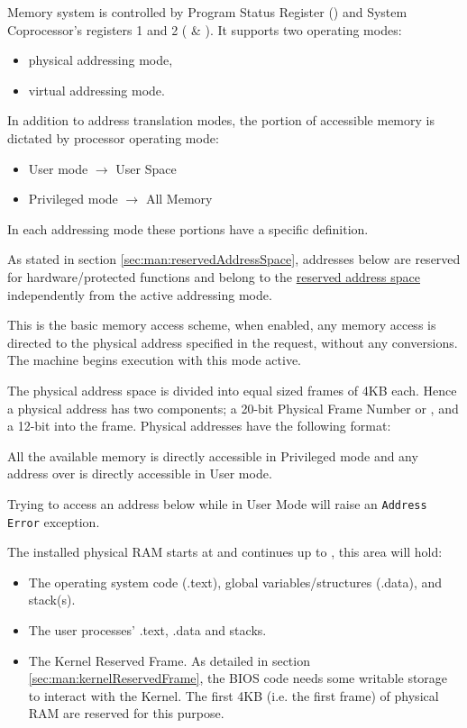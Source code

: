 \label{sec:man:memory}
Memory system is controlled by Program Status Register () and System Coprocessor's registers 1 and 2 ( \& ). It supports two operating modes:

\begin{itemize}
\item physical addressing mode, 
\item virtual addressing mode.
\end{itemize}

In addition to address translation modes, the portion of accessible memory is dictated by processor operating mode:

\begin{itemize}
\item User mode $\rightarrow$ User Space
\item Privileged mode $\rightarrow$ All Memory
\end{itemize}

In each addressing mode these portions have a specific definition.

As stated in section \ref{sec:man:reservedAddressSpace}, addresses below  are reserved for hardware/protected functions and belong to the \uline{reserved address space} independently from the active addressing mode.

This is the basic memory access scheme, when enabled, any memory access is directed to the physical address specified in the request, without any conversions.
The machine begins execution with this mode active.

The physical address space is divided into equal sized frames of 4KB each. 
Hence a physical address has two components; a 20-bit Physical Frame Number or , and a 12-bit  into the frame. 
Physical addresses have the following format:


All the available memory is directly accessible in Privileged mode and any address over  is directly accessible in User mode.


Trying to access an address below  while in User Mode will raise an \texttt{Address Error} exception.

The installed physical RAM starts at  and continues up to , this area will hold:
\begin{itemize}
	\item The operating system code (.text), global variables/structures (.data), and stack(s).
	\item The user processes’ .text, .data and stacks.
	\item The Kernel Reserved Frame. 
		As detailed in section \ref{sec:man:kernelReservedFrame}, the BIOS code needs some writable storage to interact with the Kernel. 
		The first 4KB (i.e. the first frame) of physical RAM are reserved for this purpose.
\end{itemize}

